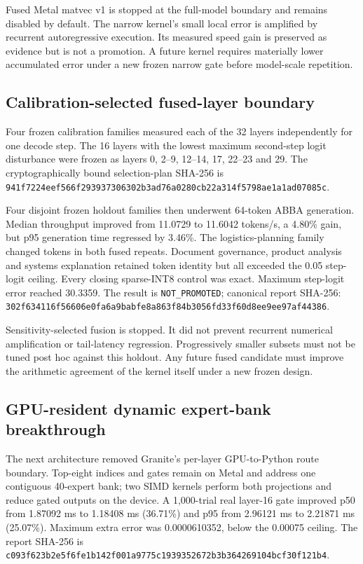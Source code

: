 Fused Metal matvec v1 is stopped at the full-model boundary and remains disabled
by default. The narrow kernel's small local error is amplified by recurrent
autoregressive execution. Its measured speed gain is preserved as evidence but
is not a promotion. A future kernel requires materially lower accumulated error
under a new frozen narrow gate before model-scale repetition.

\subsection{Calibration-selected fused-layer boundary}

Four frozen calibration families measured each of the 32 layers independently
for one decode step. The 16 layers with the lowest maximum second-step logit
disturbance were frozen as layers 0, 2--9, 12--14, 17, 22--23 and 29. The
cryptographically bound selection-plan SHA-256 is
\texttt{941f7224eef566f293937306302b3ad76a0280cb22a314f5798ae1a1ad07085c}.

Four disjoint frozen holdout families then underwent 64-token ABBA generation.
Median throughput improved from 11.0729 to 11.6042 tokens/s, a 4.80\% gain, but
p95 generation time regressed by 3.46\%. The logistics-planning family changed
tokens in both fused repeats. Document governance, product analysis and systems
explanation retained token identity but all exceeded the 0.05 step-logit ceiling.
Every closing sparse-INT8 control was exact. Maximum step-logit error reached
30.3359. The result is \texttt{NOT\_PROMOTED}; canonical report SHA-256:
\texttt{302f634116f56606e0fa6a9babfe8a863f84b3056fd33f60d8ee9ee97af44386}.

Sensitivity-selected fusion is stopped. It did not prevent recurrent numerical
amplification or tail-latency regression. Progressively smaller subsets must not
be tuned post hoc against this holdout. Any future fused candidate must improve
the arithmetic agreement of the kernel itself under a new frozen design.

\subsection{GPU-resident dynamic expert-bank breakthrough}

The next architecture removed Granite's per-layer GPU-to-Python route boundary.
Top-eight indices and gates remain on Metal and address one contiguous 40-expert
bank; two SIMD kernels perform both projections and reduce gated outputs on the
device. A 1,000-trial real layer-16 gate improved p50 from 1.87092 ms to 1.18408
ms (36.71\%) and p95 from 2.96121 ms to 2.21871 ms (25.07\%). Maximum extra
error was 0.0000610352, below the 0.00075 ceiling. The report SHA-256 is
\texttt{c093f623b2e5f6fe1b142f001a9775c1939352672b3b364269104bcf30f121b4}.


